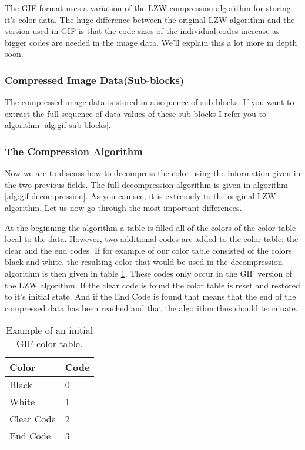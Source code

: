   The GIF format uses a variation of the LZW compression algorithm
  for storing it's color data. The huge difference between the
  original LZW algorithm and the version used in GIF is that the
  code sizes of the individual codes increase as bigger codes are
  needed in the image data. We'll explain this a lot more in depth
  soon.

  \subsubsection{Compressed Image Data(Sub-blocks)}

  The compressed image data is stored in a sequence of sub-blocks. If
  you want to extract the full sequence of data values of these
  sub-blocks I refer you to algorithm \ref{alg:gif-sub-blocks}.

  \subsubsection{The Compression Algorithm}

  Now we are to discuss how to decompress the color using the
  information given in the two previous fields. The full decompression
  algorithm is given in algorithm \ref{alg:gif-decompression}. As you
  can see, it is extremely to the original LZW algorithm. Let us now
  go through the most important differences.

  At the beginning the algorithm a table is filled all of the colors
  of the color table local to the data. However, two additional codes
  are added to the color table: the clear and the end codes. If for
  example of our color table consisted of the colors black and white,
  the resulting color that would be used in the decompression
  algorithm is then given in table
  \ref{tab:example-gif-color-table}. These codes only occur in the GIF
  version of the LZW algorithm. If the clear code is found the color
  table is reset and restored to it's initial state. And if the End
  Code is found that means that the end of the compressed data has
  been reached and that the algorithm thus should terminate.

\begin{table}
    \centering
    \begin{tabular}{ll}
      \toprule
      Color & Code \\
      \midrule
      Black & 0 \\
      White & 1 \\
      Clear Code & 2 \\
      End Code & 3 \\
      \bottomrule
    \end{tabular}
    \caption{Example of an initial GIF color table.}
    \label{tab:example-gif-color-table}
  \end{table}

